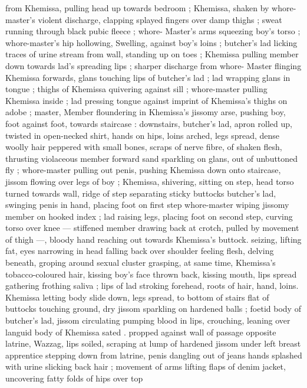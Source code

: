 from Khemissa, pulling head up towards bedroom ; Khemissa, shaken 
by whore-master's violent discharge, clapping splayed fingers over 
damp thighs ; sweat running through black pubic fleece ; whore- 
Master's arms squeezing boy's torso ; whore-master's hip hollowing, 
Swelling, against boy's loins ; butcher's lad licking traces of urine 
stream from wall, standing up on toes ; Khemissa pulling member 
down towards lad's spreading lips ; sharper discharge from whore- 
Master flinging Khemissa forwards, glans touching lips of butcher's 
lad ; lad wrapping glans in tongue ; thighs of Khemissa quivering 
against sill ; whore-master pulling Khemissa inside ; lad pressing 
tongue against imprint of Khemissa's thighs on adobe ; master, 
Member floundering in Khemissa's jissomy arse, pushing boy, foot 
against foot, towards staircase : downstairs, butcher's lad, apron 
rolled up, twisted in open-necked shirt, hands on hips, loins arched, 
legs spread, dense woolly hair peppered with small bones, scraps of 
nerve fibre, of shaken flesh, thrusting violaceous member forward 
sand sparkling on glans, out of unbuttoned fly ; whore-master 
pulling out penis, pushing Khemissa down onto staircase, jissom 
flowing over legs of boy ; Khemissa, shivering, sitting on step, head 
torso turned towards wall, ridge of step separating sticky buttocks 
butcher's lad, swinging penis in hand, placing foot on first step 
whore-master wiping jissomy member on hooked index ; lad raising 
legs, placing foot on second step, curving torso over knee --- 
stiffened member drawing back at crotch, pulled by movement of 
thigh ---, bloody hand reaching out towards Khemissa's buttock. 
seizing, lifting fat, eyes narrowing in head falling back over shoulder 
feeling flesh, delving beneath, groping around sexual cluster 
grasping, at same time, Khemissa's tobacco-coloured hair, kissing 
boy's face thrown back, kissing mouth, lips spread gathering frothing 
saliva ; lips of lad stroking forehead, roots of hair, hand, loins. 
Khemissa letting body slide down, legs spread, to bottom of stairs 
flat of buttocks touching ground, dry jissom sparkling on hardened 
balls ; foetid body of butcher's lad, jissom circulating pumping blood 
in lips, crouching, leaning over languid body of Khemissa sated . 
propped against wall of passage opposite latrine, Wazzag, lips 
soiled, scraping at lump of hardened jissom under left breast 
apprentice stepping down from latrine, penis dangling out of jeans 
hands splashed with urine slicking back hair ; movement of arms 
lifting flaps of denim jacket, uncovering fatty folds of hips over top 
